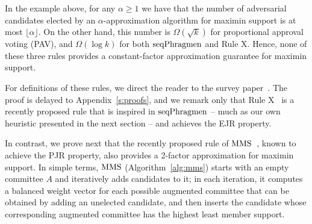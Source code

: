 \begin{lemma}\label{lem:badexamples}
In the example above, for any $\alpha \geq 1$ we have that the number of adversarial candidates elected by an $\alpha$-approximation algorithm for maximin support is at most $\lfloor \alpha \rfloor$. 
On the other hand, this number is $\Omega(\sqrt{k})$ for proportional approval voting (PAV), and $\Omega(\log k)$ for both $\operatorname{seqPhragmen}$ and Rule X. 
Hence, none of these three rules provides a constant-factor approximation guarantee for maximin support. 
\end{lemma}

For definitions of these rules, we direct the reader to the survey paper~\cite{lackner2020approval}.
The proof is delayed to Appendix~\ref{s:proofs}, and we remark only that Rule X~\cite{peters2019proportionality} is a recently proposed rule that is inspired in $\operatorname{seqPhragmen}$ -- much as our own heuristic presented in the next section -- and achieves the EJR property. 




In contrast, we prove next that the recently proposed rule of $\operatorname{MMS}$~\cite{sanchez2016maximin}, known to achieve the PJR property, also provides a 2-factor approximation for maximin support. In simple terms, $\operatorname{MMS}$ (Algorithm~\ref{alg:mms}) starts with an empty committee $A$ and iteratively adds candidates to it; in each iteration, it computes a balanced weight vector for each possible augmented committee that can be obtained by adding an unelected candidate, and then inserts the candidate whose corresponding augmented committee has the highest least member support.


